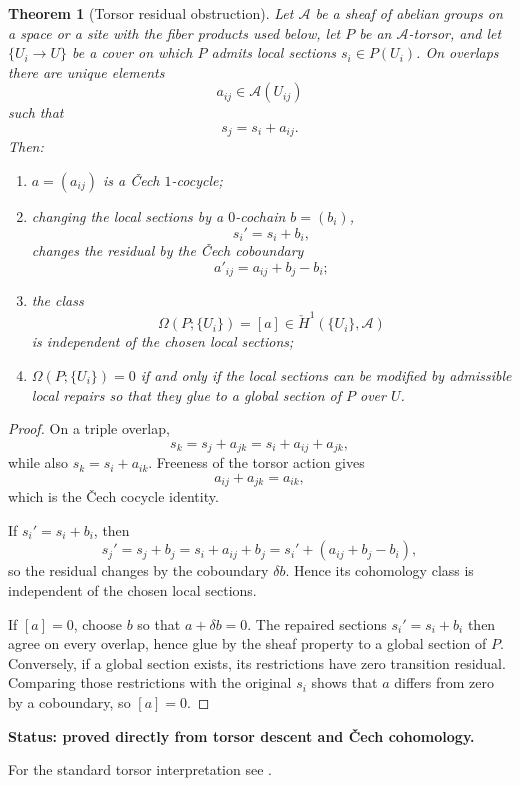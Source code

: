 \documentclass[11pt]{article}
\newtheorem{theorem}{Theorem}[section]
\theoremstyle{definition}
\theoremstyle{remark}
\newcommand{\status}[1]{\textbf{Status: #1.}}
\begin{document}
\begin{theorem}[Torsor residual obstruction]\label{thm:torsor-obstruction}
Let $\mathcal A$ be a sheaf of abelian groups on a space or a site with the fiber products used below, let $P$ be an $\mathcal A$-torsor, and let $\{U_i\to U\}$ be a cover on which $P$ admits local sections $s_i\in P(U_i)$. On overlaps there are unique elements
\[
a_{ij}\in\mathcal A(U_{ij})
\]
such that
\[
s_j=s_i+a_{ij}.
\]
Then:
\begin{enumerate}
    \item $a=(a_{ij})$ is a \v{C}ech $1$-cocycle;
    \item changing the local sections by a $0$-cochain $b=(b_i)$,
    \[
    s_i'=s_i+b_i,
    \]
    changes the residual by the \v{C}ech coboundary
    \[
    a'_{ij}=a_{ij}+b_j-b_i;
    \]
    \item the class
    \[
    \Omega(P;\{U_i\})=[a]\in\check H^1(\{U_i\},\mathcal A)
    \]
    is independent of the chosen local sections;
    \item $\Omega(P;\{U_i\})=0$ if and only if the local sections can be modified by admissible local repairs so that they glue to a global section of $P$ over $U$.
\end{enumerate}
\end{theorem}

\begin{proof}
On a triple overlap,
\[
s_k=s_j+a_{jk}=s_i+a_{ij}+a_{jk},
\]
while also $s_k=s_i+a_{ik}$. Freeness of the torsor action gives
\[
a_{ij}+a_{jk}=a_{ik},
\]
which is the \v{C}ech cocycle identity.

If $s_i'=s_i+b_i$, then
\[
s_j'=s_j+b_j=s_i+a_{ij}+b_j
=s_i'+(a_{ij}+b_j-b_i),
\]
so the residual changes by the coboundary $\delta b$. Hence its cohomology class is independent of the chosen local sections.

If $[a]=0$, choose $b$ so that $a+\delta b=0$. The repaired sections $s_i'=s_i+b_i$ then agree on every overlap, hence glue by the sheaf property to a global section of $P$. Conversely, if a global section exists, its restrictions have zero transition residual. Comparing those restrictions with the original $s_i$ shows that $a$ differs from zero by a coboundary, so $[a]=0$.
\end{proof}

\status{proved directly from torsor descent and \v{C}ech cohomology}

For the standard torsor interpretation see \cite{StacksTorsors}.
\end{document}
